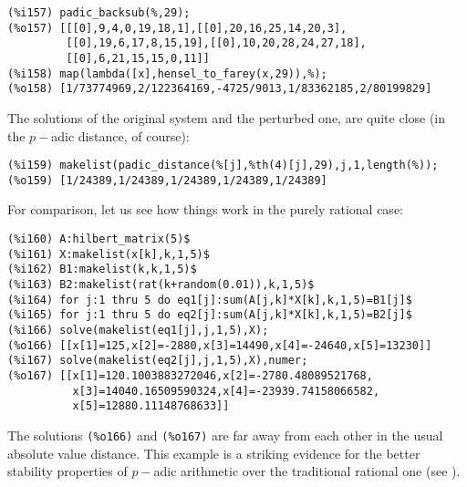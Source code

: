 \documentclass[fleqn]{cas-sc}
\begin{document}
\begin{verbatim}
(%i157)	padic_backsub(%,29);
(%o157)	[[[0],9,4,0,19,18,1],[[0],20,16,25,14,20,3],
         [[0],19,6,17,8,15,19],[[0],10,20,28,24,27,18],
         [[0],6,21,15,15,0,11]]
(%i158)	map(lambda([x],hensel_to_farey(x,29)),%);
(%o158)	[1/73774969,2/122364169,-4725/9013,1/83362185,2/80199829]
\end{verbatim}
The solutions of the original system and the perturbed one, are quite close
(in the $p-$adic distance, of course):
\begin{verbatim}
(%i159)	makelist(padic_distance(%[j],%th(4)[j],29),j,1,length(%));
(%o159)	[1/24389,1/24389,1/24389,1/24389,1/24389]
\end{verbatim}
For comparison, let us see how things work in the purely rational case:
\begin{verbatim}
(%i160)	A:hilbert_matrix(5)$
(%i161)	X:makelist(x[k],k,1,5)$
(%i162)	B1:makelist(k,k,1,5)$
(%i163)	B2:makelist(rat(k+random(0.01)),k,1,5)$
(%i164)	for j:1 thru 5 do eq1[j]:sum(A[j,k]*X[k],k,1,5)=B1[j]$
(%i165)	for j:1 thru 5 do eq2[j]:sum(A[j,k]*X[k],k,1,5)=B2[j]$
(%i166)	solve(makelist(eq1[j],j,1,5),X);
(%o166)	[[x[1]=125,x[2]=-2880,x[3]=14490,x[4]=-24640,x[5]=13230]]
(%i167)	solve(makelist(eq2[j],j,1,5),X),numer;
(%o167)	[[x[1]=120.1003883272046,x[2]=-2780.48089521768,
          x[3]=14040.16509590324,x[4]=-23939.74158066582,
          x[5]=12880.11148768633]]
\end{verbatim}
The solutions \texttt{(\%o166)} and \texttt{(\%o167)} are far away 
from each other in the usual absolute 	value distance. This example
is a striking evidence for the better stability 	properties of $p-$adic
arithmetic over the traditional rational one (see \cite{7,4,3,5,6,11}).
\end{document}
